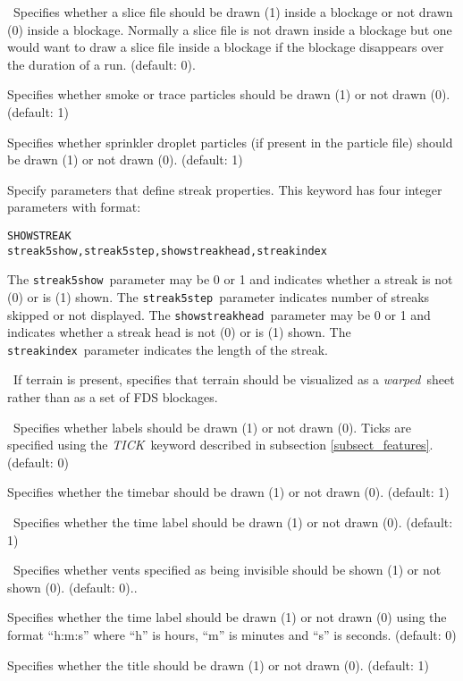 \documentclass[11pt,twoside]{book}
\begin{document}
{\ Specifies whether a slice file should be drawn (1) inside
a blockage or not drawn (0) inside a blockage.  Normally a slice file
is not drawn inside a blockage but one would want to draw a
slice file inside a blockage if the blockage disappears over the
duration of a run.  (default: 0).


Specifies whether smoke or trace particles
should be drawn (1) or not drawn (0). (default: 1)

Specifies whether
sprinkler droplet particles (if present in the particle file)
should be drawn (1) or not drawn (0).
(default: 1)

Specify parameters that define streak properties.  This keyword
has four integer parameters with format:
\begin{lstlisting}
SHOWSTREAK
streak5show,streak5step,showstreakhead,streakindex
\end{lstlisting}
The {\tt streak5show}\ parameter may be 0 or 1 and indicates whether a
streak is not (0) or is (1) shown. The {\tt streak5step}\ parameter
indicates number of streaks skipped or not displayed.
The {\tt showstreakhead}\ parameter may be 0 or 1 and indicates
whether a streak head is not (0) or is (1) shown.
The {\tt streakindex}\ parameter indicates the length of the streak.


\ If terrain is present, specifies that terrain
should be visualized as a {\em warped}\ sheet
rather than as a set of FDS blockages.

\ Specifies whether labels should be drawn (1) or
not drawn (0).  Ticks are specified using the {\em TICK}\ keyword
described in subsection \ref{subsect_features}. (default: 0)

Specifies whether the timebar should be drawn
(1) or not drawn (0). (default: 1)

\ Specifies whether the time label should be
drawn (1) or not drawn (0). (default: 1)

\ Specifies whether vents specified as being invisible should be
shown (1) or not shown (0). (default: 0)..

Specifies whether the time label should be
drawn (1) or not drawn (0) using the format ``h:m:s'' where ``h''
is hours, ``m'' is minutes and ``s'' is seconds.  (default: 0)

Specifies whether
the title should be drawn (1) or not drawn (0).
(default: 1)

}
\end{document}
